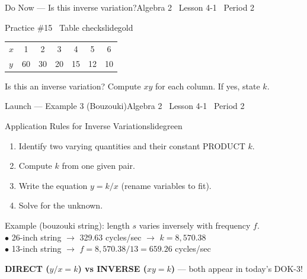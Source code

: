 \documentclass[aspectratio=169, 14pt]{beamer}
\begin{document}

\begin{frame}{Do Now --- Is this inverse variation?}{Algebra 2 \textperiodcentered\ Lesson 4-1 \textperiodcentered\ Period 2}
\vspace{0.2cm}
\begin{projcard}{Practice \#15 \textperiodcentered\ Table check}{slidegold}
\begin{tabular}{l|cccccc}
\(x\) & 1 & 2 & 3 & 4 & 5 & 6 \\
\(y\) & 60 & 30 & 20 & 15 & 12 & 10 \\
\end{tabular}

\vspace{0.25cm}
Is this an inverse variation? Compute \(xy\) for each column.
If yes, state \(k\).
\end{projcard}
\end{frame}

\begin{frame}{Launch --- Example 3 (Bouzouki)}{Algebra 2 \textperiodcentered\ Lesson 4-1 \textperiodcentered\ Period 2}
\vspace{0.2cm}
\begin{projcard}{Application Rules for Inverse Variation}{slidegreen}
\begin{enumerate}
  \setlength{\itemsep}{0pt}
  \item Identify two varying quantities and their constant PRODUCT \(k\).
  \item Compute \(k\) from one given pair.
  \item Write the equation \(y = k/x\) (rename variables to fit).
  \item Solve for the unknown.
\end{enumerate}

\vspace{0.1cm}
\small
Example (bouzouki string): length \(s\) varies inversely with frequency \(f\).\\
\hspace*{1em}\(\bullet\) 26-inch string \(\rightarrow\) 329.63 cycles/sec \(\rightarrow\) \(k = 8{,}570.38\)\\
\hspace*{1em}\(\bullet\) 13-inch string \(\rightarrow\) \(f = 8{,}570.38 / 13 = 659.26\) cycles/sec

\vspace{0.1cm}
\textcolor{slideaccent}{\textbf{DIRECT (\(y/x = k\)) vs INVERSE (\(xy = k\))} --- both appear in today's DOK-3!}
\end{projcard}
\end{frame}
\end{document}
